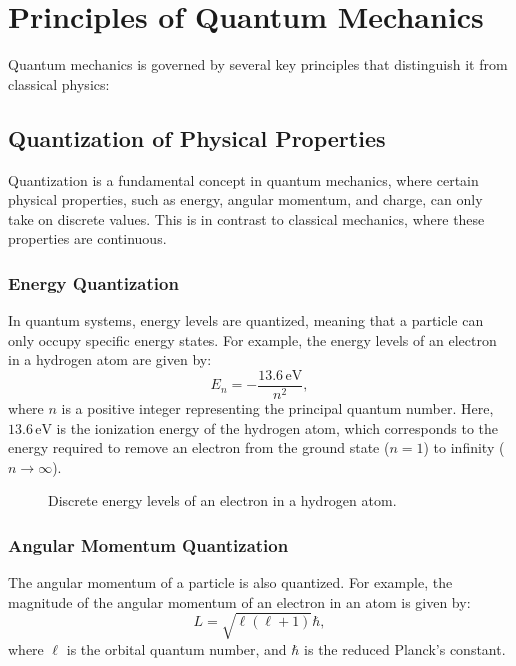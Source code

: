\documentclass[12pt,a4paper]{report}
\begin{document}
\section{Principles of Quantum Mechanics}
Quantum mechanics is governed by several key principles that distinguish it from classical physics:

\subsection{Quantization of Physical Properties}
Quantization is a fundamental concept in quantum mechanics, where certain physical properties, such as energy, angular momentum, and charge, can only take on discrete values. This is in contrast to classical mechanics, where these properties are continuous.

\subsubsection{Energy Quantization}
In quantum systems, energy levels are quantized, meaning that a particle can only occupy specific energy states. For example, the energy levels of an electron in a hydrogen atom are given by:
\[
E_n = -\frac{13.6 \, \text{eV}}{n^2},
\]
where \( n \) is a positive integer representing the principal quantum number. Here, \( 13.6 \, \text{eV} \) is the ionization energy of the hydrogen atom, which corresponds to the energy required to remove an electron from the ground state (\( n = 1 \)) to infinity (\( n \to \infty \)).

\begin{figure}[H]
    \centering
    \caption{Discrete energy levels of an electron in a hydrogen atom.}
\end{figure}

\subsubsection{Angular Momentum Quantization}
The angular momentum of a particle is also quantized. For example, the magnitude of the angular momentum of an electron in an atom is given by:
\[
L = \sqrt{\ell(\ell + 1)} \hbar,
\]
where \( \ell \) is the orbital quantum number, and \( \hbar \) is the reduced Planck's constant.
\end{document}
